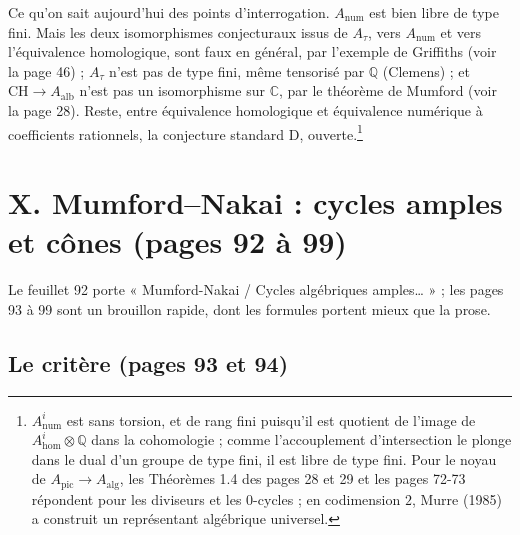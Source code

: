 \documentclass[11pt,a4paper]{article}
\begin{document}
Ce qu'on sait aujourd'hui des points d'interrogation. $A_{\mathrm{num}}$ est
bien libre de type fini. Mais les deux isomorphismes conjecturaux issus de
$A_{\tau}$, vers $A_{\mathrm{num}}$ et vers l'équivalence homologique, sont faux
en général, par l'exemple de Griffiths (voir la page 46) ; $A_{\tau}$ n'est pas de
type fini, même tensorisé par $\mathbb{Q}$ (Clemens) ; et $\mathrm{CH} \to
A_{\mathrm{alb}}$ n'est pas un isomorphisme sur $\mathbb{C}$, par le théorème
de Mumford (voir la page 28). Reste, entre équivalence homologique et
équivalence numérique à coefficients rationnels, la conjecture standard D,
ouverte.\footnote{$A^{i}_{\mathrm{num}}$ est sans torsion, et de rang fini
puisqu'il est quotient de l'image de $A^{i}_{\mathrm{hom}} \otimes \mathbb{Q}$
dans la cohomologie ; comme l'accouplement d'intersection le plonge dans le dual
d'un groupe de type fini, il est libre de type fini. Pour le noyau de
$A_{\mathrm{pic}} \to A_{\mathrm{alg}}$, les Théorèmes 1.4 des pages 28 et 29 et
les pages 72-73 répondent pour les diviseurs et les $0$-cycles ; en
codimension $2$, Murre (1985) a construit un représentant algébrique universel.}

\section*{X. Mumford--Nakai : cycles amples et cônes (pages 92 à 99)}

Le feuillet 92 porte « Mumford-Nakai / Cycles algébriques amples… » ; les
pages 93 à 99 sont un brouillon rapide, dont les formules portent mieux que la
prose.

\subsection*{Le critère (pages 93 et 94)}
\end{document}
